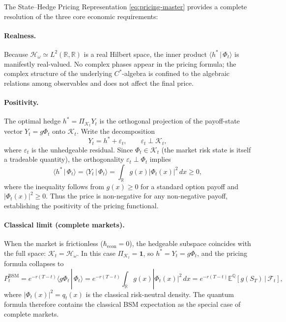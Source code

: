 \begin{remark}
\label{rem:state-hedge-econ}
The State--Hedge Pricing Representation \eqref{eq:pricing-master} provides a complete
resolution of the three core economic requirements:

\paragraph{Realness.}
Because $\mathcal{H}_\omega \simeq L^2(\mathbb{R}, \mathbb{R})$ is a real Hilbert
space, the inner product $\langle h^* \,|\, \Phi_t \rangle$ is manifestly real-valued.
No complex phases appear in the pricing formula; the complex structure of the
underlying $C^*$-algebra is confined to the algebraic relations among observables
and does not affect the final price.

\paragraph{Positivity.}
The optimal hedge $h^* = \Pi_{\mathcal{K}_t} Y_t$ is the orthogonal projection of
the payoff-state vector $Y_t = g \Phi_t$ onto $\mathcal{K}_t$. Write the
decomposition
\begin{equation*}
    Y_t = h^* + \varepsilon_t, \qquad \varepsilon_t \perp \mathcal{K}_t,
\end{equation*}
where $\varepsilon_t$ is the unhedgeable residual. Since $\Phi_t \in \mathcal{K}_t$
(the market risk state is itself a tradeable quantity), the orthogonality
$\varepsilon_t \perp \Phi_t$ implies
\begin{equation*}
    \langle h^* \,|\, \Phi_t \rangle = \langle Y_t \,|\, \Phi_t \rangle
    = \int_{\mathbb{R}} g(x) |\Phi_t(x)|^2 \, dx \geq 0,
\end{equation*}
where the inequality follows from $g(x) \geq 0$ for a standard option payoff and
$|\Phi_t(x)|^2 \geq 0$. Thus the price is non-negative for any non-negative payoff,
establishing the positivity of the pricing functional.

\paragraph{Classical limit (complete markets).}
When the market is frictionless ($\hbar_{\mathrm{econ}} = 0$), the hedgeable
subspace coincides with the full space: $\mathcal{K}_t = \mathcal{H}_\omega$. In
this case $\Pi_{\mathcal{K}_t} = \mathbf{1}$, so $h^* = Y_t = g \Phi_t$, and the
pricing formula collapses to
\begin{equation*}
    P_t^{\mathrm{BSM}} = e^{-r(T-t)} \langle g \Phi_t \,|\, \Phi_t \rangle
    = e^{-r(T-t)} \int_{\mathbb{R}} g(x) |\Phi_t(x)|^2 \, dx
    = e^{-r(T-t)} \mathbb{E}^{\mathbb{Q}}[g(S_T) \,|\, \mathcal{F}_t],
\end{equation*}
where $|\Phi_t(x)|^2 = q_t(x)$ is the classical risk-neutral density. The quantum
formula therefore contains the classical BSM expectation as the special case of
complete markets.


\end{remark}
